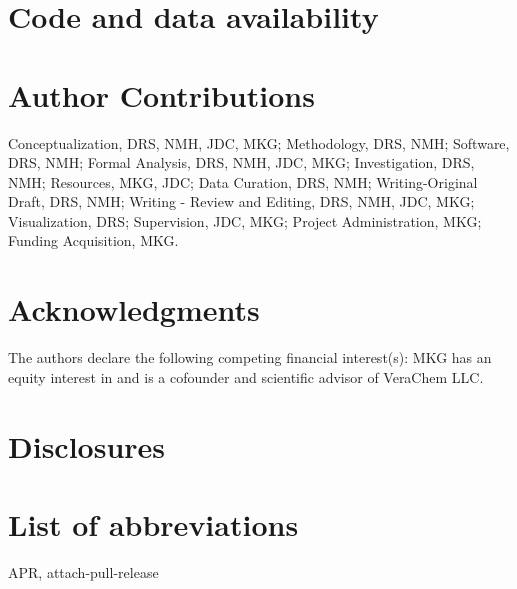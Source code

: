 \documentclass[9pt,lineno]{elife}
\begin{document}

\section{Code and data availability}

\section{Author Contributions}
Conceptualization, DRS, NMH, JDC, MKG; Methodology, DRS, NMH; Software, DRS, NMH; Formal Analysis, DRS, NMH, JDC, MKG; Investigation, DRS, NMH; Resources, MKG, JDC;  Data Curation, DRS, NMH; Writing-Original Draft, DRS, NMH; Writing - Review and Editing, DRS, NMH, JDC, MKG; Visualization, DRS; Supervision, JDC, MKG; Project Administration, MKG; Funding Acquisition, MKG.

\section{Acknowledgments}
The authors declare the following competing financial interest(s): MKG has an equity interest in and is a cofounder and scientific advisor of VeraChem LLC.
\section{Disclosures}




\appendix
\section{List of abbreviations}
APR, attach-pull-release
\end{document}
